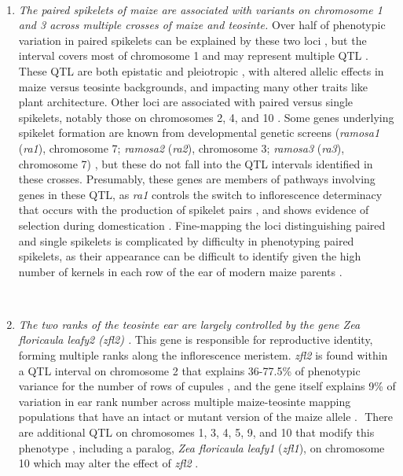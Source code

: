 \documentclass[9pt,twocolumn,twoside]{rilabRxiv}
\begin{document}
﻿\begin{enumerate}

 \item \textit{The paired spikelets of maize are associated with variants on chromosome 1 and 3 across multiple crosses of maize and teosinte.}
 Over half of phenotypic variation in paired spikelets can be explained by these two loci \citep{doebley1991, doebley1993}, but the interval covers most of chromosome 1 and may represent multiple QTL \citep{doebley1993}.
 These QTL are both epistatic and pleiotropic \citep{doebley1995}, with altered allelic effects in maize versus teosinte backgrounds, and impacting many other traits like plant architecture.
 Other loci are associated with paired versus single spikelets, notably those on chromosomes 2, 4, and 10 \citep{doebley1991, doebley1993}. %
 Some genes underlying spikelet formation are known from developmental genetic screens (\textit{ramosa1} (\textit{ra1}), chromosome 7; \textit{ramosa2} (\textit{ra2}), chromosome 3; \textit{ramosa3} (\textit{ra3}), chromosome 7) \citep{vollbrecht2005, mcsteen2006}, but these do not fall into the QTL intervals identified in these crosses.
 Presumably, these genes are members of pathways involving genes in these QTL, as \textit{ra1} controls the switch to inflorescence determinacy that occurs with the production of spikelet pairs \citep{vollbrecht2005}, and shows evidence of selection during domestication \citep{sigmon2010}.
Fine-mapping the loci distinguishing paired and single spikelets is complicated by difficulty in phenotyping paired spikelets, as their appearance can be difficult to identify given the high number of kernels in each row of the ear of modern maize parents \citep{galinat1988}.


﻿ \item \textit{The two ranks of the teosinte ear are largely controlled by the gene \textit{Zea floricaula leafy2} (\textit{zfl2}) \citep{bomblies2006}. }
 This gene is responsible for reproductive identity, forming multiple ranks along the inflorescence meristem.
 \textit{zfl2} is found within a QTL interval on chromosome 2 that explains 36-77.5\% of phenotypic variance for the number of rows of cupules \citep{doebley1991, doebley1993}, and the gene itself explains 9\% of variation in ear rank number across multiple maize-teosinte mapping populations that have an intact or mutant version of the maize allele \citep{bomblies2006}.
 ﻿ There are additional QTL on chromosomes 1, 3, 4, 5, 9, and 10  that modify this phenotype \citep{doebley1991, doebley1993, briggs2007}, including a paralog, \textit{Zea floricaula leafy1} (\textit{zfl1}), on chromosome 10 \citep{briggs2007} which may alter the effect of \textit{zfl2} \citep{bomblies2006}.


\end{enumerate}
\end{document}
